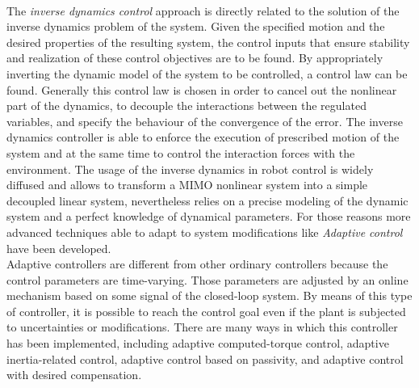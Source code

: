 \\
The \textit{inverse dynamics control} approach is directly related to the solution of the inverse dynamics problem of the system. Given the specified motion and the desired properties of the resulting system, the control inputs that ensure stability and realization of these control objectives are to be found. By appropriately inverting the dynamic model of the system to be controlled, a control law can be found. Generally this control law is chosen in order to cancel out the nonlinear part of the dynamics, to decouple the interactions between the regulated variables, and specify the behaviour of the convergence of the error. The inverse dynamics controller is able to enforce the execution of prescribed motion of the system and at the same time to control the interaction forces with the environment.
The usage of the inverse dynamics in robot control is widely diffused and allows to transform a MIMO nonlinear system into a simple decoupled linear system, nevertheless relies on a precise modeling of the dynamic system and a perfect knowledge of dynamical parameters. For those reasons more advanced techniques able to adapt to system modifications like \textit{Adaptive control} have been developed.  
\\
Adaptive controllers are different from other ordinary controllers because the control parameters are time-varying. Those parameters are adjusted by an online mechanism based on some signal of the closed-loop system. By means of this type of controller, it is possible to reach the control goal even if the plant is subjected to uncertainties or modifications. There are many ways in which this controller has been implemented, including adaptive computed-torque control, adaptive inertia-related control, adaptive control based on passivity, and adaptive control with desired compensation. 

